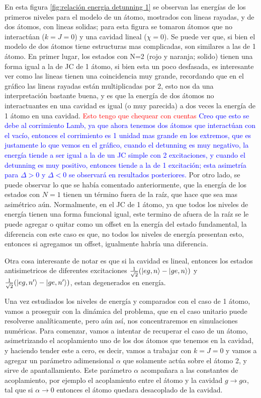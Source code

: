 En esta figura \ref{fig:relación energia detunning 1} se observan las energías de los primeros niveles para el modelo de un átomo, mostrados con lineas rayadas, y de dos átomos, con lineas solidas; para esta figura se tomaron átomos que no interactúan ($k=J=0$) y una cavidad lineal ($\chi=0$). Se puede ver que, si bien el modelo de dos átomos tiene estructuras mas complicadas, son similares a las de 1 átomo. En primer lugar, los estados con N=2 (rojo y naranja; solido) tienen una forma igual a la de JC de 1 átomo, si bien esta un poco desfasada, es interesante ver como las lineas tienen una coincidencia muy grande, recordando que en el gráfico las lineas rayadas están multiplicadas por 2, esto nos da una interpretación bastante buena, y es que la energía de dos átomos no interactuantes en una cavidad es igual (o muy parecida) a dos veces la energía de 1 átomo en una cavidad. \textcolor{red}{Esto tengo que chequear con cuentas} \textcolor{blue}{Creo que esto se debe al corrimiento Lamb, ya que ahora tenemos dos átomos que interactúan con el vacío, entonces el corrimiento es 1 unidad mas grande en los extremos, que es justamente lo que vemos en el gráfico, cuando el detunning es muy negativo, la energ\'ia tiende a ser igual a la de un JC simple con 2 excitaciones, y cuando el detunning es muy positivo, entonces tiende a la de 1 excitaci\'on; esta asimetr\'ia para $\Delta>0$ y $\Delta<0$ se observar\'a en resultados posteriores.} Por otro lado, se puede observar lo que se había comentado anteriormente, que la energ\'ia de los estados con $N=1$ tienen un t\'ermino fuera de la raíz, que hace que sea mas asim\'etrico a\'un. Normalmente, en el JC de 1 átomo, ya que todos los niveles de energía tienen una forma funcional igual, este termino de afuera de la raíz se le puede agregar o quitar como un offset en la energía del estado fundamental, la diferencia con este caso es que, no todos los niveles de energía presentan esto, entonces si agregamos un offset, igualmente habría una diferencia. 

Otra cosa interesante de notar es que si la cavidad es lineal, entonces los estados antisimetricos de diferentes excitaciones $\frac{1}{\sqrt{2}}(\ket{eg,n}-\ket{ge,n})$ y $\frac{1}{\sqrt{2}}(\ket{eg,n'}-\ket{ge,n'})$, estan degenerados en energía.

Una vez estudiados los niveles de energía y comparados con el caso de 1 átomo, vamos a proseguir con la dinámica del problema, que en el caso unitario puede resolverse analíticamente, pero a\'un así, nos concentraremos en simulaciones numéricas.
Para comenzar, vamos a intentar de recuperar el caso de un átomo, asimetrizando el acoplamiento uno de los dos átomos que tenemos en la cavidad, y haciendo tender este a cero, es decir, vamos a trabajar con $k=J=0$ y vamos a agregar un parámetro adimensional $\alpha$ que solamente actúa sobre el átomo 2, y sirve de apantallamiento. Este parámetro $\alpha$ acompañara a las constantes de acoplamiento, por ejemplo el acoplamiento entre el átomo y la cavidad $g\rightarrow g\alpha$, tal que si $\alpha \rightarrow 0$ entonces el átomo quedara desacoplado de la cavidad. 

